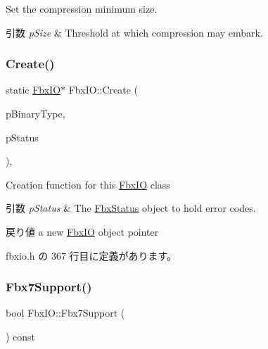 Set the compression minimum size. 
\begin{DoxyParams}{引数}
{\em p\+Size} & Threshold at which compression may embark. \\
\hline
\end{DoxyParams}
\mbox{\label{class_fbx_i_o_a4f769569a424543d247289687b9b74bd}} 
\subsubsection{\texorpdfstring{Create()}{Create()}}
{\footnotesize\ttfamily static \hyperlink{class_fbx_i_o}{Fbx\+IO}$\ast$ Fbx\+I\+O\+::\+Create (\begin{DoxyParamCaption}\item[{\hyperlink{class_fbx_i_o_ad0532f36367fa6b750993000dfb8ed1e}{Binary\+Type}}]{p\+Binary\+Type,  }\item[{\hyperlink{class_fbx_status}{Fbx\+Status} \&}]{p\+Status }\end{DoxyParamCaption})\hspace{0.3cm}{\ttfamily [inline]}, {\ttfamily [static]}}

Creation function for this \hyperlink{class_fbx_i_o}{Fbx\+IO} class 
\begin{DoxyParams}{引数}
{\em p\+Status} & The \hyperlink{class_fbx_status}{Fbx\+Status} object to hold error codes. \\
\hline
\end{DoxyParams}
\begin{DoxyReturn}{戻り値}
a new \hyperlink{class_fbx_i_o}{Fbx\+IO} object pointer 
\end{DoxyReturn}


 fbxio.\+h の 367 行目に定義があります。

\mbox{\label{class_fbx_i_o_a8aec1669dd3e06d2b77e861dde5c328b}} 
\subsubsection{\texorpdfstring{Fbx7\+Support()}{Fbx7Support()}\hspace{0.1cm}{\footnotesize\ttfamily [1/2]}}
{\footnotesize\ttfamily bool Fbx\+I\+O\+::\+Fbx7\+Support (\begin{DoxyParamCaption}{ }\end{DoxyParamCaption}) const}

